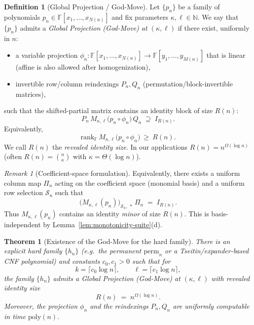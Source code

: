 \documentclass[12pt]{article}
\newtheorem{theorem}{Theorem}
\theoremstyle{definition}
\newtheorem{definition}{Definition}
\theoremstyle{definition}
\theoremstyle{remark}
\newtheorem{remark}{Remark}
\theoremstyle{remark}
\begin{document}
\begin{definition}[Global Projection / God-Move]\label{def:god-move}
Let $\{p_n\}$ be a family of polynomials $p_n \in \mathbb{F}[x_1,\dots,x_{N(n)}]$ and fix parameters $\kappa,\ell \in \mathbb{N}$.
We say that $\{p_n\}$ admits a \emph{Global Projection (God-Move) at $(\kappa,\ell)$} if there exist, uniformly in $n$:
\begin{itemize}
\item a variable projection $\phi_n:\mathbb{F}[x_1,\dots,x_{N(n)}]\to \mathbb{F}[y_1,\dots,y_{M(n)}]$ that is linear (affine is also allowed after homogenization),
\item invertible row/column reindexings $P_n,Q_n$ (permutation/block-invertible matrices),
\end{itemize}
such that the shifted-partial matrix contains an identity block of size $R(n)$:
\[
P_n\, M_{\kappa,\ell}\!\big(p_n \circ \phi_n\big)\, Q_n \;\supseteq\; I_{R(n)}.
\]
Equivalently,
\[
\mathrm{rank}_{\mathbb{F}}\, M_{\kappa,\ell}\!\big(p_n \circ \phi_n\big)\ \ge\ R(n).
\]
We call $R(n)$ the \emph{revealed identity size}. In our applications $R(n)=n^{\Omega(\log n)}$ (often $R(n)=\binom{n}{\kappa}$ with $\kappa=\Theta(\log n)$).
\end{definition}

\begin{remark}[Coefficient-space formulation]\label{rem:god-move-coeff}
Equivalently, there exists a uniform column map $\Pi_n$ acting on the coefficient space (monomial basis) and a uniform row selection $\mathcal S_n$ such that
\[
\big(M_{\kappa,\ell}(p_n)\big)_{\mathcal S_n,\ *}\,\Pi_n \;=\; I_{R(n)}.
\]
Thus $M_{\kappa,\ell}(p_n)$ contains an identity \emph{minor} of size $R(n)$. This is basis-independent by Lemma~\ref{lem:monotonicity-suite}(d).
\end{remark}

\begin{theorem}[Existence of the God-Move for the hard family]\label{thm:god-move-existence}
There is an explicit hard family $\{h_n\}$ (e.g.\ the permanent $\mathrm{perm}_n$ or a Tseitin/expander-based CNF polynomial) and constants $c_0,c_1>0$ such that for
\[
k=\big\lceil c_0 \log n \big\rceil,\qquad \ell=\big\lceil c_1 \log n \big\rceil,
\]
the family $\{h_n\}$ admits a Global Projection (God-Move) at $(\kappa,\ell)$ with revealed identity size
\[
R(n)\;=\; n^{\Omega(\log n)}.
\]
Moreover, the projection $\phi_n$ and the reindexings $P_n,Q_n$ are uniformly computable in time $\mathrm{poly}(n)$.
\end{theorem}
\end{document}
